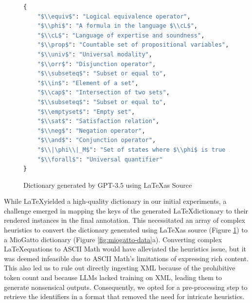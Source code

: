 \begin{figure}[htpb]
  \centering
  \begin{lstlisting}[language=python]
{    
    "$\\equiv$": "Logical equivalence operator",
    "$\\phi$": "A formula in the language $\\cL$",
    "$\\cL$": "Language of expertise and soundness",
    "$\\prop$": "Countable set of propositional variables",
    "$\\univ$": "Universal modality",
    "$\\orr$": "Disjunction operator",
    "$\\subseteq$": "Subset or equal to",
    "$\\in$": "Element of a set",
    "$\\cap$": "Intersection of two sets",
    "$\\subseteq$": "Subset or equal to",
    "$\\emptyset$": "Empty set",
    "$\\sat$": "Satisfaction relation",
    "$\\neg$": "Negation operator",
    "$\\and$": "Conjunction operator",
    "$\\|\phi\\|_M$": "Set of states where $\\phi$ is true in model $M$",
    "$\\forall$": "Universal quantifier"
}
  \end{lstlisting}
  \caption[GPT Dictionary from LaTeX]{Dictionary generated by GPT-3.5 using \LaTeX \space as Source}\label{fig:latex-dict}
\end{figure}

While \LaTeX \space yielded a high-quality dictionary in our initial experiments, a challenge emerged in mapping the keys of the generated \LaTeX \space dictionary to their rendered instances in the final annotation. This necessitated an array of complex heuristics to convert the dictionary generated using \LaTeX \space as source (Figure \ref{fig:latex-dict}) to a MioGatto dictionary (Figure \ref{fig:miogatto-data}a). Converting complex \LaTeX \space equations to ASCII Math would have alleviated the heuristics issue, but it was deemed infeasible due to ASCII Math's limitations of expressing rich content. This also led us to rule out directly ingesting XML because of the prohibitive token count and because \ac{LLMs} lacked training on XML, leading them to generate nonsensical outputs. Consequently, we opted for a pre-processing step to retrieve the identifiers in a format that removed the need for intricate heuristics.


